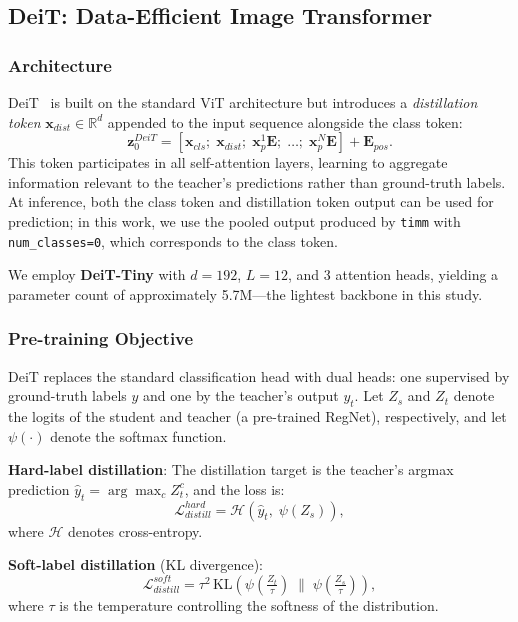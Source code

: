 \documentclass[journal]{IEEEtran}
\begin{document}
\subsection{DeiT: Data-Efficient Image Transformer}
\label{subsec:deit}

\subsubsection{Architecture}
DeiT~\cite{touvron2021deit} is built on the standard ViT architecture but introduces a
\textit{distillation token} $\mathbf{x}_{dist} \in \mathbb{R}^d$ appended to the input sequence
alongside the class token:
\begin{equation}
    \mathbf{z}_0^{DeiT} = [\mathbf{x}_{cls};\; \mathbf{x}_{dist};\;
    \mathbf{x}_p^1\mathbf{E};\; \ldots;\; \mathbf{x}_p^N\mathbf{E}] + \mathbf{E}_{pos}.
\end{equation}
This token participates in all self-attention layers, learning to aggregate information relevant
to the teacher's predictions rather than ground-truth labels. At inference, both the class token
and distillation token output can be used for prediction; in this work, we use the pooled output
produced by \texttt{timm} with \texttt{num\_classes=0}, which corresponds to the class token.

We employ \textbf{DeiT-Tiny} with $d = 192$, $L = 12$, and 3 attention heads, yielding a
parameter count of approximately 5.7M—the lightest backbone in this study.

\subsubsection{Pre-training Objective}
DeiT replaces the standard classification head with dual heads: one supervised by ground-truth
labels $y$ and one by the teacher's output $y_t$. Let $Z_s$ and $Z_t$ denote the logits of the
student and teacher (a pre-trained RegNet), respectively, and let $\psi(\cdot)$ denote the
softmax function.

\textbf{Hard-label distillation}: The distillation target is the teacher's argmax prediction
$\hat{y}_t = \arg\max_c Z_t^c$, and the loss is:
\begin{equation}
    \mathcal{L}_{distill}^{hard} = \mathcal{H}\!\left(\hat{y}_t,\; \psi(Z_s)\right),
\end{equation}
where $\mathcal{H}$ denotes cross-entropy.

\textbf{Soft-label distillation} (KL divergence):
\begin{equation}
    \mathcal{L}_{distill}^{soft} = \tau^2 \,
    \text{KL}\!\left(\psi\!\left(\tfrac{Z_t}{\tau}\right) \;\Big\|\;
    \psi\!\left(\tfrac{Z_s}{\tau}\right)\right),
\end{equation}
where $\tau$ is the temperature controlling the softness of the distribution.
\end{document}
